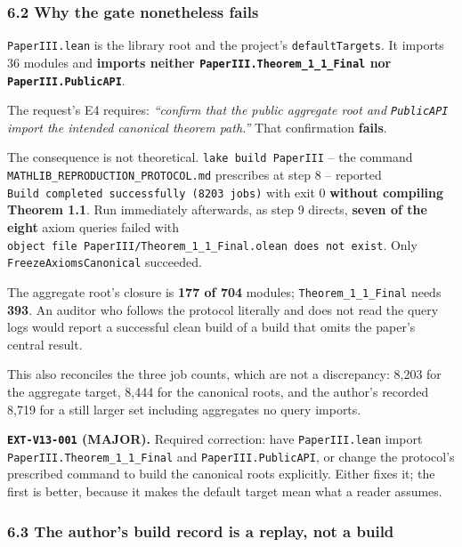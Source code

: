 \documentclass[
  10pt,
]{article}
\newcounter{none} %
\begin{document}
\subsubsection{6.2 Why the gate nonetheless
fails}\label{why-the-gate-nonetheless-fails}

\texttt{PaperIII.lean} is the library root and the project's
\texttt{defaultTargets}. It imports 36 modules and \textbf{imports
neither \texttt{PaperIII.Theorem\_1\_1\_Final} nor
\texttt{PaperIII.PublicAPI}}.

The request's E4 requires: \emph{``confirm that the public aggregate
root and \texttt{PublicAPI} import the intended canonical theorem
path.''} That confirmation \textbf{fails}.

The consequence is not theoretical. \texttt{lake\ build\ PaperIII} --
the command \texttt{MATHLIB\_REPRODUCTION\_PROTOCOL.md} prescribes at
step 8 -- reported \texttt{Build\ completed\ successfully\ (8203\ jobs)}
with exit 0 \textbf{without compiling Theorem 1.1}. Run immediately
afterwards, as step 9 directs, \textbf{seven of the eight} axiom queries
failed with
\texttt{object\ file\ \textquotesingle{}PaperIII/Theorem\_1\_1\_Final.olean\textquotesingle{}\ does\ not\ exist}.
Only \texttt{FreezeAxiomsCanonical} succeeded.

The aggregate root's closure is \textbf{177 of 704} modules;
\texttt{Theorem\_1\_1\_Final} needs \textbf{393}. An auditor who follows
the protocol literally and does not read the query logs would report a
successful clean build of a build that omits the paper's central result.

This also reconciles the three job counts, which are not a discrepancy:
8,203 for the aggregate target, 8,444 for the canonical roots, and the
author's recorded 8,719 for a still larger set including aggregates no
query imports.

\textbf{\texttt{EXT-V13-001} (MAJOR).} Required correction: have
\texttt{PaperIII.lean} import \texttt{PaperIII.Theorem\_1\_1\_Final} and
\texttt{PaperIII.PublicAPI}, or change the protocol's prescribed command
to build the canonical roots explicitly. Either fixes it; the first is
better, because it makes the default target mean what a reader assumes.

\subsubsection{6.3 The author's build record is a replay, not a
build}\label{the-authors-build-record-is-a-replay-not-a-build}
\end{document}
